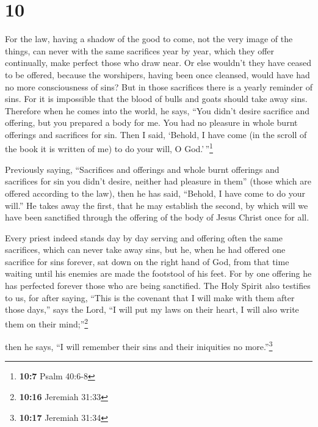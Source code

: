 \hypertarget{section-9}{%
\section{10}\label{section-9}}

 For the law, having a shadow of the good to come, not the
very image of the things, can never with the same sacrifices year by
year, which they offer continually, make perfect those who draw near.
 Or else wouldn't they have ceased to be offered, because
the worshipers, having been once cleansed, would have had no more
consciousness of sins?  But in those sacrifices there is a
yearly reminder of sins.  For it is impossible that the
blood of bulls and goats should take away sins.  Therefore
when he comes into the world, he says, ``You didn't desire sacrifice and
offering, but you prepared a body for me.  You had no
pleasure in whole burnt offerings and sacrifices for sin. 
Then I said, `Behold, I have come (in the scroll of the book it is
written of me) to do your will, O God.'\,''\footnote{\textbf{10:7} Psalm
  40:6-8}

 Previously saying, ``Sacrifices and offerings and whole
burnt offerings and sacrifices for sin you didn't desire, neither had
pleasure in them'' (those which are offered according to the law),
 then he has said, ``Behold, I have come to do your
will.'' He takes away the first, that he may establish the second,
 by which will we have been sanctified through the
offering of the body of Jesus Christ once for all.

 Every priest indeed stands day by day serving and
offering often the same sacrifices, which can never take away sins,
 but he, when he had offered one sacrifice for sins
forever, sat down on the right hand of God,  from that
time waiting until his enemies are made the footstool of his feet.
 For by one offering he has perfected forever those who
are being sanctified.  The Holy Spirit also testifies to
us, for after saying,  ``This is the covenant that I will
make with them after those days,'' says the Lord, ``I will put my laws
on their heart, I will also write them on their mind;''\footnote{\textbf{10:16}
  Jeremiah 31:33}

then he says,  ``I will remember their sins and their
iniquities no more.''\footnote{\textbf{10:17} Jeremiah 31:34}


